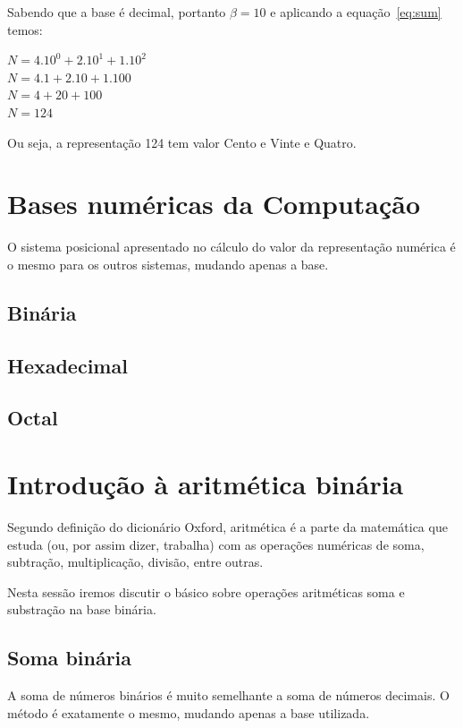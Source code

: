 Sabendo que a base é decimal, portanto $\beta=10$ e aplicando a equação~\ref{eq:sum} temos:

\begin{center}
\( N=4.10^{0}+2.10^{1}+1.10^{2}\) \\
\( N=4.1+2.10+1.100 \) \\
\( N=4+20+100 \) \\
\( N = 124\)\\
\end{center}
Ou seja, a representação 124 tem valor Cento e Vinte e Quatro. 


\section{Bases numéricas da Computação}
\label{basesComput}
O sistema posicional apresentado no cálculo do valor da representação numérica é o mesmo para os outros sistemas, mudando apenas a base.

\subsection{Binária}
\subsection{Hexadecimal}
\subsection{Octal}

\section{Introdução à aritmética binária}
\label{aritmetica}

Segundo definição do dicionário Oxford, aritmética é a parte da matemática que estuda (ou, por assim dizer, trabalha) com as operações numéricas de soma, subtração, multiplicação, divisão, entre outras.

Nesta sessão iremos discutir o básico sobre operações aritméticas soma e substração na base binária.

\subsection{Soma binária}
\label{somabinaria}

A soma de números binários é muito semelhante a soma de números decimais. O método é exatamente o mesmo, mudando apenas a base utilizada.

